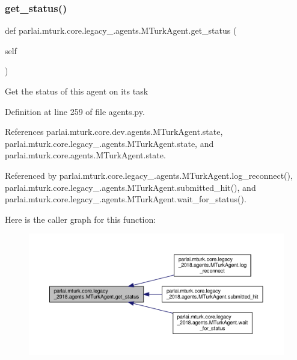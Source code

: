 \subsubsection{\texorpdfstring{get\+\_\+status()}{get\_status()}}
{\footnotesize\ttfamily def parlai.\+mturk.\+core.\+legacy\+\_.\+agents.\+M\+Turk\+Agent.\+get\+\_\+status (\begin{DoxyParamCaption}\item[{}]{self }\end{DoxyParamCaption})}

\begin{DoxyVerb}Get the status of this agent on its task\end{DoxyVerb}
 

Definition at line 259 of file agents.\+py.



References parlai.\+mturk.\+core.\+dev.\+agents.\+M\+Turk\+Agent.\+state, parlai.\+mturk.\+core.\+legacy\+\_.\+agents.\+M\+Turk\+Agent.\+state, and parlai.\+mturk.\+core.\+agents.\+M\+Turk\+Agent.\+state.



Referenced by parlai.\+mturk.\+core.\+legacy\+\_.\+agents.\+M\+Turk\+Agent.\+log\+\_\+reconnect(), parlai.\+mturk.\+core.\+legacy\+\_.\+agents.\+M\+Turk\+Agent.\+submitted\+\_\+hit(), and parlai.\+mturk.\+core.\+legacy\+\_.\+agents.\+M\+Turk\+Agent.\+wait\+\_\+for\+\_\+status().

Here is the caller graph for this function\+:
\nopagebreak
\begin{figure}[H]
\begin{center}
\leavevmode
\includegraphics[width=350pt]{classparlai_1_1mturk_1_1core_1_1legacy__2018_1_1agents_1_1MTurkAgent_abb7463e1f56718d7faf6829a71f7d05a_icgraph}
\end{center}
\end{figure}
\mbox{\label{classparlai_1_1mturk_1_1core_1_1legacy__2018_1_1agents_1_1MTurkAgent_a45ac31e91fb1d40d2a4907e56e13cce6}} 
